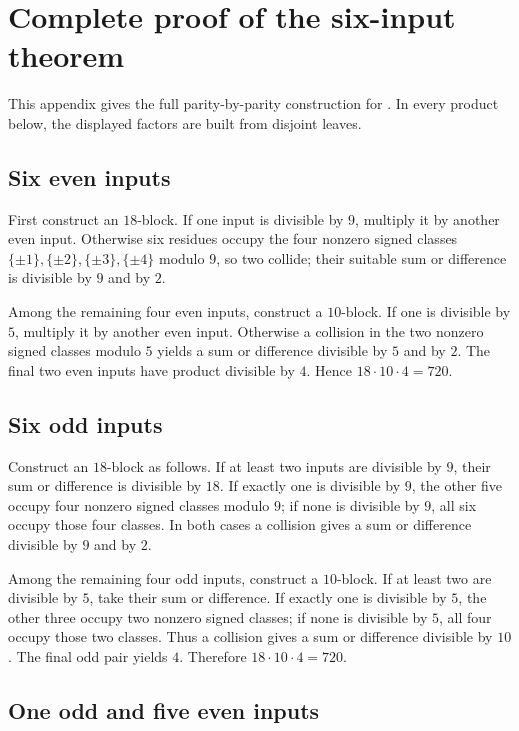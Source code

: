 \section{Complete proof of the six-input theorem}\label{app:six}

This appendix gives the full parity-by-parity construction for
.  In every product below, the displayed factors are built
from disjoint leaves.

\subsection{Six even inputs}\label{app:six0}

First construct an $18$-block.  If one input is divisible by $9$, multiply it
by another even input.  Otherwise six residues occupy the four nonzero
signed classes $\{\pm1\},\{\pm2\},\{\pm3\},\{\pm4\}$ modulo $9$, so two
collide; their suitable sum or difference is divisible by $9$ and by $2$.

Among the remaining four even inputs, construct a $10$-block.  If one is
divisible by $5$, multiply it by another even input.  Otherwise a collision
in the two nonzero signed classes modulo $5$ yields a sum or difference
divisible by $5$ and by $2$.  The final two even inputs have product divisible
by $4$.  Hence $18\cdot10\cdot4=720$.

\subsection{Six odd inputs}\label{app:six6}

Construct an $18$-block as follows.  If at least two inputs are divisible by
$9$, their sum or difference is divisible by $18$.  If exactly one is
divisible by $9$, the other five occupy four nonzero signed classes modulo
$9$; if none is divisible by $9$, all six occupy those four classes.  In both
cases a collision gives a sum or difference divisible by $9$ and by $2$.

Among the remaining four odd inputs, construct a $10$-block.  If at least two
are divisible by $5$, take their sum or difference.  If exactly one is
divisible by $5$, the other three occupy two nonzero signed classes; if none
is divisible by $5$, all four occupy those two classes.  Thus a collision
gives a sum or difference divisible by $10$.  The final odd pair yields $4$.
Therefore $18\cdot10\cdot4=720$.

\subsection{One odd and five even inputs}\label{app:six1}

